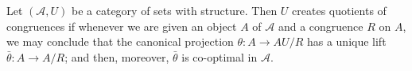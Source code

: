 Let $(\mathcal{A}, U)$ be a category of sets with structure. Then $U$ creates quotients of congruences if whenever we are given an object $A$ of $\mathcal{A}$ and a congruence $R$ on $A$, we may conclude that the canonical projection $\theta: A \longrightarrow AU/R$ has a unique lift $\bar{\theta}: A \longrightarrow A/R$; and then, moreover, $\bar{\theta}$ is co-optimal in $\mathcal{A}$.
